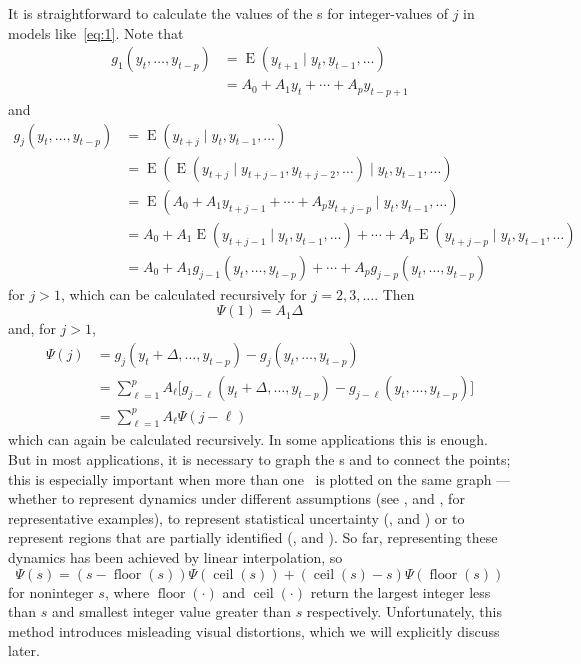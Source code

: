 \documentclass[12pt,fleqn]{article}
\DeclareMathOperator{\E}{E}
\DeclareMathOperator{\floor}{floor}
\DeclareMathOperator{\ceil}{ceil}
\begin{document}
It is straightforward to calculate the values of the \IRF s for
integer-values of $j$ in models like~\eqref{eq:1}.
Note that
\begin{align*}
  g_1(y_t,\dots,y_{t-p}) &= \E(y_{t+1} \mid y_t, y_{t-1},\dots) \\
  &= A_0 + A_1 y_{t} + \cdots + A_p y_{t-p+1}
\end{align*}
and
\begin{align*}
  g_j(y_t,\dots,y_{t-p})
  &= \E(y_{t+j} \mid y_t, y_{t-1},\dots) \\
  &= \E( \E(y_{t+j} \mid y_{t+j-1}, y_{t+j-2},\dots) \mid y_t, y_{t-1},\dots) \\
  &= \E( A_0 + A_1 y_{t+j-1} + \cdots + A_p y_{t+j-p} \mid y_t, y_{t-1},\dots) \\
  &= A_0 + A_1 \E(y_{t+j-1} \mid y_t, y_{t-1},\dots) + \cdots + A_p \E(y_{t+j-p} \mid y_t, y_{t-1},\dots) \\
  &= A_0 + A_1 g_{j-1}(y_t,\dots,y_{t-p}) + \cdots + A_p g_{j-p}(y_t,\dots,y_{t-p})
\end{align*}
for $j > 1$, which can be calculated recursively for $j =
2,3,\dots$. Then
\begin{equation*}
  \Psi(1) = A_1 \Delta
\end{equation*}
and, for $j > 1$,
\begin{align*}
  \Psi(j)
  &= g_j(y_t + \Delta,\dots,y_{t-p}) - g_j(y_t,\dots,y_{t-p}) \\
  &= \sum_{\ell = 1}^{p} A_\ell \big[g_{j-\ell}(y_t+\Delta,\dots,y_{t-p}) - g_{j-\ell}(y_t,\dots,y_{t-p})\big] \\
  &= \sum_{\ell = 1}^{p} A_\ell \Psi(j-\ell)
\end{align*}
which can again be calculated recursively. In some applications this
is enough. But in most applications, it is necessary to graph the \IRF
s and to connect the points; this is especially important when more
than one \IRF\ is plotted on the same graph --- whether to represent
dynamics under different assumptions (see \citealp{BeM:98}, and
\citealp{StW:01}, for representative examples), to represent
statistical uncertainty (\citealp{Kil:98}, and \citealp{SiZ:99}) or to
represent regions that are partially identified (\citealp{Uhl:05}, and
\citealp{InK:13}). So far, representing these dynamics has been
achieved by linear interpolation, so 
\begin{equation*}
  \Psi(s) = (s - \floor(s)) \Psi(\ceil(s)) + (\ceil(s) - s) \Psi(\floor(s))
\end{equation*}
for noninteger $s$, where $\floor(\cdot)$ and $\ceil(\cdot)$ return
the largest integer less than $s$ and smallest integer value greater
than $s$ respectively.  Unfortunately, this method introduces
misleading visual distortions, which we will explicitly discuss later.
\end{document}
